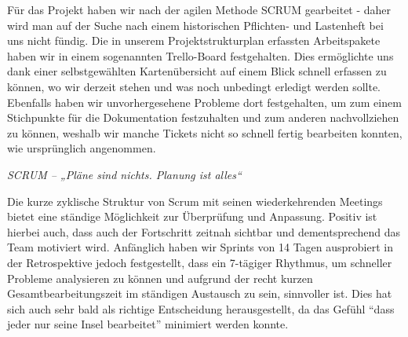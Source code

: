 
Für das Projekt haben wir nach der agilen Methode SCRUM gearbeitet - daher wird man auf der Suche nach einem historischen Pflichten- und Lastenheft bei uns nicht fündig. Die in unserem Projektstrukturplan erfassten Arbeitspakete haben wir in einem sogenannten Trello-Board festgehalten. Dies ermöglichte uns dank einer selbstgewählten Kartenübersicht auf einem Blick schnell erfassen zu können, wo wir derzeit stehen und was noch unbedingt erledigt werden sollte. Ebenfalls haben wir unvorhergesehene Probleme dort festgehalten, um zum einem Stichpunkte für die Dokumentation festzuhalten und zum anderen nachvollziehen zu  können, weshalb wir manche Tickets  nicht so schnell fertig bearbeiten konnten, wie ursprünglich angenommen. 
\begin{center}
	\textit{SCRUM – „Pläne sind nichts. Planung ist alles“}
\end{center}
Die kurze zyklische Struktur von Scrum mit seinen wiederkehrenden Meetings bietet eine ständige Möglichkeit zur Überprüfung und Anpassung. Positiv ist hierbei auch, dass auch der Fortschritt zeitnah sichtbar und dementsprechend das Team motiviert wird. Anfänglich haben wir Sprints von 14 Tagen ausprobiert in der Retrospektive jedoch festgestellt, dass ein  7-tägiger Rhythmus, um schneller Probleme analysieren zu können und aufgrund der recht kurzen Gesamtbearbeitungszeit im ständigen Austausch zu sein, sinnvoller ist. Dies hat sich auch sehr bald als richtige Entscheidung herausgestellt, da das Gefühl “dass jeder nur seine Insel bearbeitet” minimiert werden konnte.

